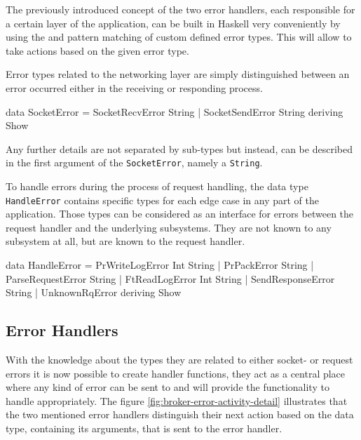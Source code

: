 The previously introduced concept of the two error handlers, each responsible
for a certain layer of the application, can be built in Haskell very
conveniently by using the 
and pattern matching of custom defined error types. This will allow to take
actions based on the given error type.  

Error types related to the networking layer are simply distinguished between an
error occurred either in the receiving or responding process.

\begin{code}
data SocketError =
      SocketRecvError String
      | SocketSendError String
      deriving Show
\end{code}

Any further details are not separated by sub-types but instead, can be described
in the first argument of the \lstinline{SocketError}, namely a
\lstinline{String}.

To handle errors during the process of request handling, the data type
\lstinline{HandleError} contains specific types for each edge case in any part
of the application. Those types can be considered as an interface for errors
between the request handler and the underlying subsystems. They are not known to
any subsystem at all, but are known to the request handler.

\begin{code}
data HandleError =
        PrWriteLogError Int String
      | PrPackError String
      | ParseRequestError String
      | FtReadLogError Int String
      | SendResponseError String
      | UnknownRqError
        deriving Show
\end{code}


\subsection{Error Handlers}

With the knowledge about the types they are related to either socket- or request
errors it is now possible to create handler functions, they act as a central
place where any kind of error can be sent to and will provide the
functionality to handle appropriately. The figure
\ref{fig:broker-error-activity-detail} illustrates that the two
mentioned error handlers distinguish their next action based on the data type,
containing its arguments, that is sent to the error handler.

